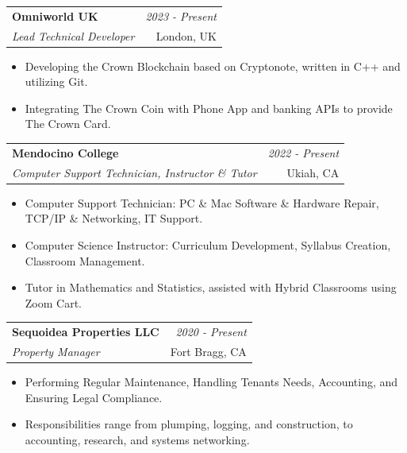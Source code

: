 \documentclass[a4paper, 11pt]{article}
\makeatletter
\newcommand{\resumeSubheading}[4]{
	\vspace{0.5mm}\item
	\begin{tabular*}{0.98\textwidth}[t]{l@{\extracolsep{\fill}}r}
		\textbf{#1} & \textit{\footnotesize{#4}} \\
		\textit{\footnotesize{#3}} &  \footnotesize{#2}\\
	\end{tabular*}
	\vspace{-2.4mm}
}
\newcommand{\resumeItemListStart}{\begin{justify}\begin{itemize}[leftmargin=3ex, rightmargin=2ex, noitemsep,labelsep=1.2mm,itemsep=0mm]\small}
\newcommand{\resumeItemListEnd}{\end{itemize}\end{justify}\vspace{-2mm}}
\makeatother
\begin{document}
	\vspace{-3.0mm}
	
	\resumeSubheading
	{Omniworld UK}{London, UK}
	{Lead Technical Developer}{2023 - Present}
	\vspace{-1.0mm}
	\resumeItemListStart
	\item {Developing the Crown Blockchain based on Cryptonote, written in C++ and utilizing Git.}
	\item {Integrating The Crown Coin with Phone App and banking APIs to provide The Crown Card.}
	\resumeItemListEnd
	
	\vspace{-3.0mm}
		
	\resumeSubheading
	{Mendocino College}{Ukiah, CA}
	{Computer Support Technician, Instructor \& Tutor}{2022 - Present}
	\vspace{-1.0mm}
	\resumeItemListStart
	\item {Computer Support Technician:  PC \& Mac Software \& Hardware Repair, TCP/IP \& Networking, IT Support.}
	\item {Computer Science Instructor:  Curriculum Development, Syllabus Creation, Classroom Management.}
	\item {Tutor in Mathematics and Statistics, assisted with Hybrid Classrooms using Zoom Cart.}
	\resumeItemListEnd
	
	\vspace{-3.0mm}
	
	\resumeSubheading
	{Sequoidea Properties LLC}{Fort Bragg, CA}
	{Property Manager}{2020 - Present}
	\vspace{-1.0mm}
	\resumeItemListStart
	\item {Performing Regular Maintenance, Handling Tenants Needs,  Accounting, and Ensuring Legal Compliance.}
	\item {Responsibilities range from plumping, logging, and construction, to accounting, research, and systems networking.}
	\resumeItemListEnd
	
	
	
\end{document}

